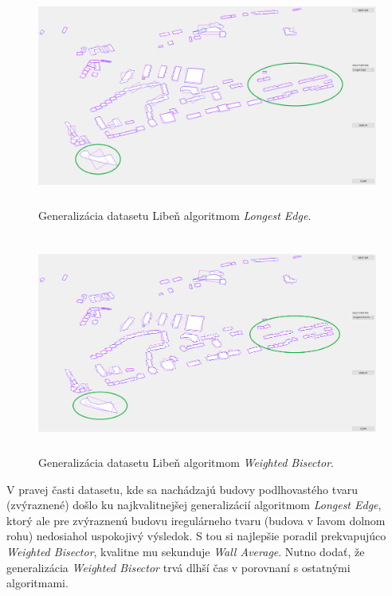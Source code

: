 \documentclass[11pt]{article}
\begin{document}
\begin{figure}[h]
\captionsetup{justification=centering}
\centering
\includegraphics[width=14.65cm, height=7.2cm]{images/liben_le.png}
\caption{Generalizácia datasetu Libeň algoritmom \textit{Longest Edge}.}
\label{fig:obr12}
\end{figure}

\begin{figure}[h]
\captionsetup{justification=centering}
\centering
\includegraphics[width=14.65cm, height=7.2cm]{images/liben_bi.png}
\caption{Generalizácia datasetu Libeň algoritmom \textit{Weighted Bisector}.}
\label{fig:obr13}
\end{figure}

\noindent V pravej časti datasetu, kde sa nachádzajú budovy podlhovastého tvaru (zvýraznené) došlo ku najkvalitnejšej generalizácií algoritmom \textit{Longest Edge}, ktorý ale pre zvýraznenú budovu iregulárneho tvaru (budova v ľavom dolnom rohu) nedosiahol uspokojivý výsledok. S tou si najlepšie poradil prekvapujúco \textit{Weighted Bisector}, kvalitne mu sekunduje \textit{Wall Average}. Nutno dodať, že generalizácia \textit{Weighted Bisector} trvá dlhší čas v porovnaní s ostatnými algoritmami.
\newpage
\end{document}
